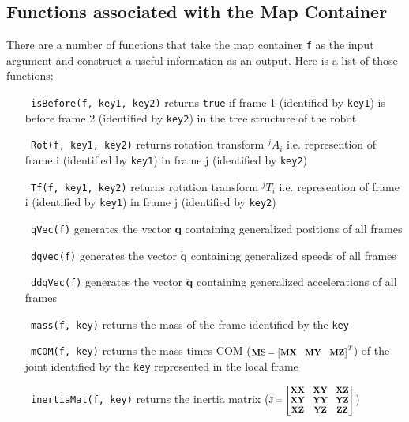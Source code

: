 \documentclass[a4paper,10pt]{article}
\newcommand\scalemath[2]{\scalebox{#1}{\mbox{\ensuremath{\displaystyle #2}}}}
\begin{document}
\subsection{Functions associated with the Map Container}

There are a number of functions that take the map container \texttt{f} as the input argument and construct a useful
information as an output. Here is a list of those functions:
\begin{itemize}[label={}]
 \item[\texttt{\relsize{-2} isBefore(f, key1, key2)}] returns \texttt{true} if frame 1 (identified by \texttt{key1}) is before frame 2 
 (identified by \texttt{key2}) in the tree structure of the robot
 \item[\texttt{\relsize{-2} Rot(f, key1, key2)}] returns rotation transform ${}^jA_i$ i.e. represention of frame i (identified by \texttt{key1}) in frame j (identified by \texttt{key2})
 \item[\texttt{\relsize{-2} Tf(f, key1, key2)}] returns rotation transform ${}^jT_i$ i.e. represention of frame i (identified by \texttt{key1}) in frame j (identified by \texttt{key2})
 \item[\texttt{\relsize{-2} qVec(f)}] generates the vector $\mathbf{q}$ containing generalized positions of all frames
 \item[\texttt{\relsize{-2} dqVec(f)}] generates the vector $\mathbf{\dot{q}}$ containing generalized speeds of all frames
 \item[\texttt{\relsize{-2} ddqVec(f)}] generates the vector $\mathbf{\ddot{q}}$ containing generalized accelerations of all frames
 \item[\texttt{\relsize{-2} mass(f, key)}] returns the mass of the frame identified by the \texttt{key}
 \item[\texttt{\relsize{-2} mCOM(f, key)}] returns the mass times COM ($\scalemath{0.75}{\mathbf{MS}=\left[\begin{matrix} \mathbf{MX} & \mathbf{MY} & \mathbf{MZ} \end{matrix}\right]^T}$)
 of the joint identified by the \texttt{key} represented in the local frame
 \item[\texttt{\relsize{-2} inertiaMat(f, key)}] returns the inertia matrix 
 ($\scalemath{0.75}{\mathbf{J}=\left[\begin{matrix} \mathbf{XX} & \mathbf{XY} & \mathbf{XZ} \\ \mathbf{XY} & \mathbf{YY} & \mathbf{YZ} \\ \mathbf{XZ} & \mathbf{YZ} & \mathbf{ZZ} \end{matrix}\right]}$)

\end{itemize}
\end{document}
